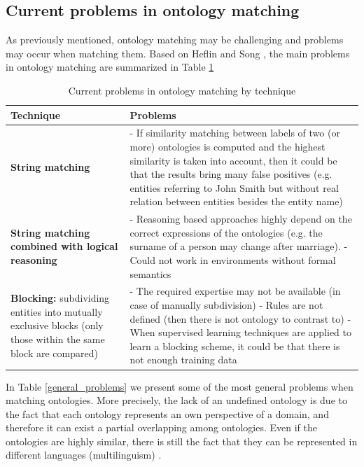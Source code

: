 \documentclass[runningheads]{llncs}
\begin{document}
\subsection{Current problems in ontology matching}
As previously mentioned, ontology matching may be challenging and problems may occur when matching them. Based on Heflin and Song \cite{Heflin}, the main problems in ontology matching are summarized in Table \ref{current_problems}
\begin{table}
\caption{Current problems in ontology matching by technique}\label{current_problems}
\begin{tabular}{|p{5cm}|p{8cm}|}
\hline
    \textbf{Technique}&
    \textbf{Problems}
\\
\hline
\textbf{String matching} & - If similarity matching between labels of two (or more) ontologies is computed and the highest similarity is taken into account, then it could be that the results bring many false positives (e.g. entities referring to John Smith but without real relation between entities besides the entity name)\\
\hline
\textbf{String matching combined with logical reasoning} & - Reasoning based approaches highly depend on the correct expressions of the ontologies (e.g. the surname of a person may change after marriage). \newline - Could not work in environments without formal semantics
\\
\hline
\textbf{Blocking:} subdividing entities into mutually exclusive blocks (only those within the same block are compared)
 & - The required expertise may not be available (in case of manually subdivision) \newline
- Rules are not defined (then there is not ontology to contrast to) \newline
- When supervised learning techniques are applied to learn a blocking scheme, it could be that there is not enough training data	\\
\hline
\end{tabular}
\end{table}
In Table \ref{general_problems} we present some of the most general problems when matching ontologies. More precisely, the lack of an undefined ontology is due to the fact that each ontology represents an own perspective of a domain, and therefore it can exist a partial overlapping among ontologies. Even if the ontologies are highly similar, there is still the fact that they can be represented in different languages (multilinguism) \cite{ref_url3}.
\end{document}
